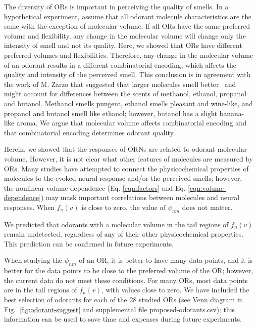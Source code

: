 \documentclass[fleqn,11pt]{wlscirep}
\newcommand{\numberofreceptors}{ 28 }
\begin{document}
The diversity of ORs is important in perceiving the quality of smells. 
In a hypothetical experiment, 
assume that all odorant molecule characteristics are the same with the exception of molecular volume.
If all ORs have the same preferred volume and flexibility, 
any change in the molecular volume will change only the intensity of smell and not its quality.
Here, we showed that ORs have different preferred volumes and flexibilities. 
Therefore, any change in the molecular volume of an odorant results in a different combinatorial encoding, which affects the quality and intensity of the perceived smell.
This conclusion is in agreement with the work of M. Zarzo that suggested that larger molecules smell better~\cite{zarzo2011}
and might account for differences between the scents of methanol, ethanol, propanol and butanol. 
Methanol smells pungent, ethanol smells pleasant and wine-like, and propanol and butanol smell like ethanol; however, butanol has a slight banana-like aroma.
We argue that molecular volume affects combinatorial encoding 
and that combinatorial encoding determines odorant quality.

Herein, we showed that the responses of ORNs are related to odorant molecular volume. 
However, it is not clear what other features of molecules are measured by ORs. 
Many studies have attempted to connect the physicochemical properties of molecules to the evoked neural response and/or the perceived smells;
however, the nonlinear volume dependence (Eq. \ref{eqn:factors} and Eq. \ref{eqn:volume-dependence}) may mask important correlations between molecules and neural responses.
When $f_n(v)$ is close to zero, 
the value of $\psi_{nm}$ does not matter. 

We predicted that odorants with a molecular volume in the tail regions of $f_n(v)$ remain undetected, 
regardless of any of their other physicochemical properties. 
This prediction can be confirmed in future experiments. 

When studying the $\psi_{nm}$ of an OR, 
it is better to have many data points, and it is better for the data points to be close to the preferred volume of the OR; however, the current data do not meet these conditions. 
For many ORs, 
most data points are in the tail regions of $f_n(v)$, with values close to zero.
We have included the best selection of odorants for each of the \numberofreceptors studied ORs 
(see Venn diagram in Fig.~\ref{fig:odorant-suggest} and supplemental file proposed-odorants.csv); this information can be used to save time and expenses during future experiments. 
\end{document}
